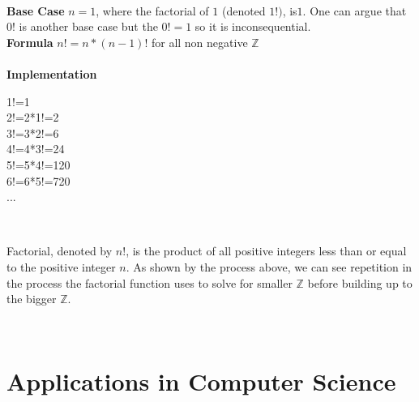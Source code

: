 \documentclass{article}
\begin{document}
\\
{\bf Base Case} $n=1$, where the factorial of $1$ (denoted $1!)$, is$ 1$.
One can argue that $0!$ is another base case but the $0!=1$ so it is inconsequential. 
\\
{\bf Formula} $n! = n * (n-1)!$ for all non negative $\mathbb{Z}$ 
\\
~\\
{\bf Implementation} \\
\begin{center}
	1!=1
	\\
	2!=2*1!=2
	\\
	3!=3*2!=6
	\\
	4!=4*3!=24
	\\
	5!=5*4!=120
	\\
	6!=6*5!=720
	\\
	...

\end{center}
~\\
\begin{comment}Factorials can be defined as the product of all positive $\mathbb{Z}$ less than $n$. In the factorials you can see recursion solving instances of smaller problems when the factorial of $k$ is computed by finding out the factorials of smaller positive $\mathbb{Z}$, like $(k-1)$. And unlike the Fibonacci Sequence, Factorial's base case, $n=1$, is its "terminating condition", or the point where the recursive process ends, so that the recursion does not continue infinitely.  
\end{comment}
Factorial, denoted by $n!$, is the product of all positive integers less than or equal to the positive integer $n$.  As shown by the process above, we can see repetition in the process the factorial function uses to solve for smaller $\mathbb{Z}$ before building up to the bigger $\mathbb{Z}$.  

~\\
\section{Applications in Computer Science}
\end{document}

